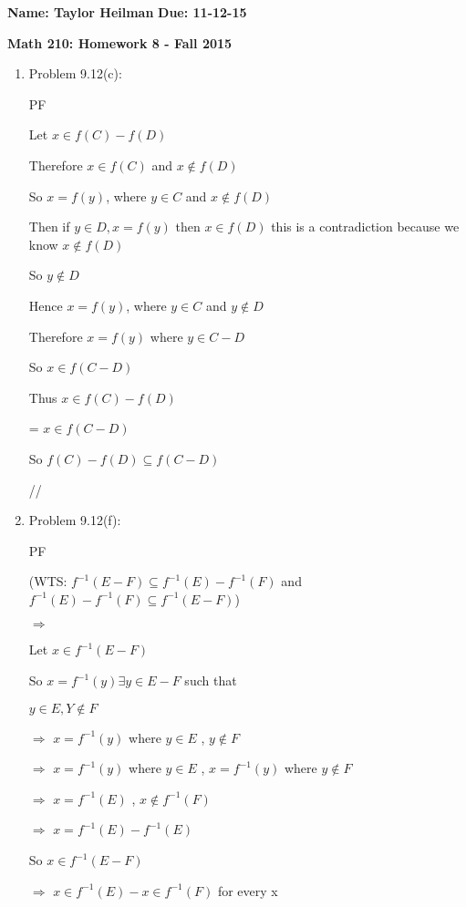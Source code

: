\documentclass[12pt]{article}
\begin{document}
\textbf{Name: Taylor Heilman}    \hspace{4in} \textbf{Due: 11-12-15}
\begin{center} \textbf{Math 210: Homework 8 - Fall 2015} \end{center}

\begin{enumerate}

\item Problem 9.12(c):

{PF

Let $x \in f(C) - f(D)$

Therefore $x \in f(C)$ and $x \notin f(D)$

So $x = f(y)$, where $y \in C$ and $x \notin f(D)$

Then if $y \in D, x = f(y)$ then $x \in f(D)$  this is a contradiction because we know $x \notin f(D)$

So $y \notin D$

Hence $x = f(y)$, where $y \in C$ and $y \notin D$

Therefore $x = f(y)$ where $y \in C - D$

So $x \in f(C-D)$

Thus $x \in f(C) -f(D)$

= $x \in f(C-D)$ 

So $f(C) - f(D) \subseteq f(C-D)$


//
}

\item Problem 9.12(f):

{PF

(WTS: $f^{-1}(E-F) \subseteq f^{-1}(E)-f^{-1}(F)$ and $f^{-1}(E) - f^{-1}(F) \subseteq f^{-1}(E-F)$)

$\Rightarrow$

Let $x \in f^{-1}(E-F)$

So $x = f^{-1}(y)  \exists y \in E-F$ such that

$y \in E, Y \notin F$

$\Rightarrow$ $x = f^{-1}(y)$ where $y \in E$ , $y \notin F$

$\Rightarrow$ $x = f^{-1}(y)$ where $y \in E$ , $x =  f^{-1}(y)$ where $y \notin F$

$\Rightarrow$ $x = f^{-1}(E)$ , $x \notin  f^{-1}(F)$

$\Rightarrow$ $x = f^{-1}(E) - f^{-1}(E)$

So  $x \in f^{-1}(E-F) $ 

$\Rightarrow$  $x \in f^{-1}(E) - x \in f^{-1}(F) $ for every x

}
\end{enumerate}
\end{document}
